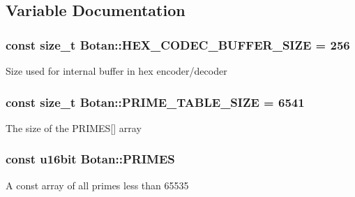 \subsection{Variable Documentation}
\hypertarget{namespaceBotan_a74718b9df0b68e9b2d04755c39d3b55d}{
\subsubsection[{H\-E\-X\-\_\-\-C\-O\-D\-E\-C\-\_\-\-B\-U\-F\-F\-E\-R\-\_\-\-S\-I\-Z\-E}]{\setlength{\rightskip}{0pt plus 5cm}const size\-\_\-t Botan\-::\-H\-E\-X\-\_\-\-C\-O\-D\-E\-C\-\_\-\-B\-U\-F\-F\-E\-R\-\_\-\-S\-I\-Z\-E = 256}}\label{namespaceBotan_a74718b9df0b68e9b2d04755c39d3b55d}
Size used for internal buffer in hex encoder/decoder \hypertarget{namespaceBotan_a501e4632aed1ca4799b03efff7dc59d7}{
\subsubsection[{P\-R\-I\-M\-E\-\_\-\-T\-A\-B\-L\-E\-\_\-\-S\-I\-Z\-E}]{\setlength{\rightskip}{0pt plus 5cm}const size\-\_\-t Botan\-::\-P\-R\-I\-M\-E\-\_\-\-T\-A\-B\-L\-E\-\_\-\-S\-I\-Z\-E = 6541}}\label{namespaceBotan_a501e4632aed1ca4799b03efff7dc59d7}
The size of the P\-R\-I\-M\-E\-S\mbox{[}\mbox{]} array \hypertarget{namespaceBotan_aba40de5bc5b2cb8a725c9c96b0e01d38}{
\subsubsection[{P\-R\-I\-M\-E\-S}]{\setlength{\rightskip}{0pt plus 5cm}const {\bf u16bit} Botan\-::\-P\-R\-I\-M\-E\-S}}\label{namespaceBotan_aba40de5bc5b2cb8a725c9c96b0e01d38}
A const array of all primes less than 65535 